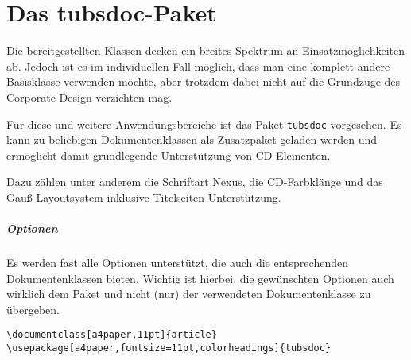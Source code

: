 \chapter{Das tubsdoc-Paket}

Die bereitgestellten Klassen decken ein breites Spektrum an Einsatzmöglichkeiten
ab. Jedoch ist es im individuellen Fall möglich, dass man eine komplett andere
Basisklasse verwenden möchte, aber trotzdem dabei nicht auf die Grundzüge
des Corporate Design verzichten mag.

Für diese und weitere Anwendungsbereiche ist das Paket \lstinline{tubsdoc}
vorgesehen. Es kann zu beliebigen Dokumentenklassen als Zusatzpaket geladen
werden und ermöglicht damit grundlegende Unterstützung von CD-Elementen.

Dazu zählen unter anderem die Schriftart Nexus, die CD-Farbklänge und das
Gauß-Layout\-system inklusive Titelseiten-Unterstützung.

\paragraph{Optionen} Es werden fast alle Optionen unterstützt, die auch
die entsprechenden Dokumentenklassen bieten. Wichtig ist hierbei,
die gewünschten Optionen auch wirklich dem Paket und nicht (nur)
der verwendeten Dokumentenklasse zu übergeben.

\begin{lstlisting}[captionpos=b,caption={Beispiel für Verwendung von tubsdoc}]
\documentclass[a4paper,11pt]{article}
\usepackage[a4paper,fontsize=11pt,colorheadings]{tubsdoc}
\end{lstlisting}
